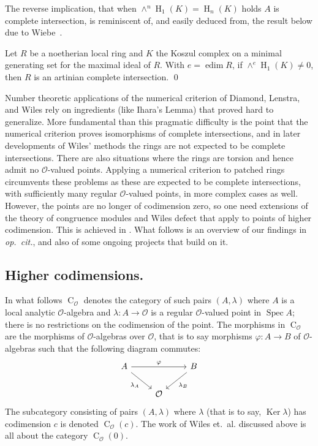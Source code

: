 \documentclass[twoside,leqno]{article}
\newcommand{\cato}{\operatorname{C}}
\newcommand{\edim}{\operatorname{edim}}
\newcommand{\hh}{\operatorname{H}}
\newcommand{\Ker}{\operatorname{Ker}}
\newcommand{\mco}{\mathcal O}
\newcommand{\Spec}{\operatorname{Spec}}
\begin{document}
The reverse implication, that when $\wedge^n\hh_1(K)=\hh_n(K)$ holds $A$ is complete intersection,  is reminiscent of, and easily deduced from, the result below due to Wiebe~\cite[Theorem 2.3.16]{Bruns/Herzog:1998a}.

\begin{theorem}
\label{th:tate-wiebe}
Let $R$ be a noetherian local ring and $K$ the Koszul complex on a minimal generating set for the maximal ideal of $R$. With $e=\edim R$, if $\wedge^e \hh_1(K)\ne 0$, then $R$ is an artinian complete intersection. \qed
\end{theorem}

Number theoretic applications of the numerical criterion of Diamond, Lenstra, and Wiles rely on ingredients (like Ihara's Lemma) that proved hard to generalize. More fundamental than this pragmatic difficulty is the point that the numerical criterion proves isomorphisms of complete intersections, and in later developments of Wiles' methods the rings are not expected to be complete intersections. There are also situations where the rings are torsion and hence admit no $\mco$-valued points. Applying a numerical criterion to patched rings circumvents these problems as these are expected to be complete intersections, with sufficiently many regular $\mco$-valued points, in more complex cases as well. However, the points are no longer of codimension zero, so one need extensions of the theory of congruence modules and Wiles defect that apply to points of higher codimension. This is achieved in \cite{Iyengar/Khare/Manning:2024a}. What follows is an overview of our findings in \emph{op.~cit.}, and also of some ongoing projects that  build on it.

\subsection*{Higher codimensions.}
In what follows $\cato_{\mco}$ denotes the category of such pairs $(A,\lambda)$ where $A$ is a local analytic $\mco$-algebra and $\lambda\colon A\to \mco$ is a regular $\mco$-valued point in $\Spec A$; there is no restrictions on the codimension of the point. The morphisms in $\cato_\mco$ are the morphisms of $\mco$-algebras over $\mco$, that is to say morphisms $\varphi \colon A\to B$ of $\mco$-algebras such that the following diagram commutes:
\[
\begin{tikzcd}
A \arrow[dr,"\lambda_A" swap] \arrow[rr,"\varphi"] && B \arrow[dl,"\lambda_B"] \\
&\mco&
\end{tikzcd}
\]
The subcategory consisting of pairs $(A,\lambda)$ where $\lambda$ (that is to say, $\Ker\lambda$) has codimension $c$ is denoted $\cato_\mco(c)$. The work of Wiles et.~al. discussed above is all about the category $\cato_\mco(0)$.
\end{document}
